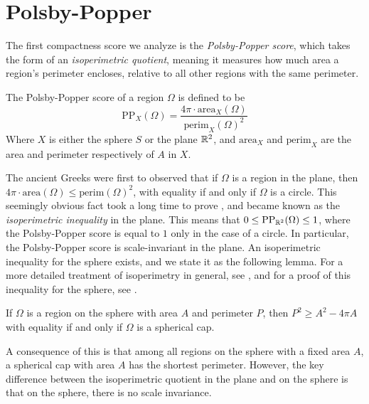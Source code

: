 \section{Polsby-Popper}\label{sec:pp}
The first compactness score we analyze is the \textit{Polsby-Popper
score}, which takes the form of an \textit{isoperimetric quotient},
meaning it measures how much area a region's perimeter encloses,
relative to all other regions with the same perimeter.

\begin{definition}\label{def:pp}
  The Polsby-Popper score of a region $\Omega$ is defined to be
  $$\mathrm{PP}_X(\Omega) = \frac{4\pi
  \cdot\mathrm{area}_X(\Omega)}{\mathrm{perim}_X(\Omega)^2}$$ 
  Where $X$ is either the sphere $S$ or the plane $\mathbb{R}^2$, and
  $\mathrm{area}_X$ and $\mathrm{perim}_X$ are the area and perimeter
  respectively of $A$ in $X$.
\end{definition}

The ancient Greeks were first to observed that if $\Omega$ is a region
in the plane, then $4\pi\cdot\mathrm{area}(\Omega)\leq
\mathrm{perim}(\Omega)^2$, with equality if and only if $\Omega$ is
a circle. This seemingly obvious fact took a long time to prove%
, and became known as the \textit{isoperimetric inequality} in
the plane.  This means that $0\le \mathrm{PP}_{\mathbb{R}^2}(\Omega)\le 1$,
where the Polsby-Popper score is equal to $1$ only in the case of
a circle. In particular, the Polsby-Popper score is scale-invariant in
the plane. An isoperimetric inequality for the sphere exists, and we
state it as the following lemma.  For a more detailed treatment of
isoperimetry in general, see \cite{osserman1979bonnesen}, and for
a proof of this inequality for the sphere, see \cite{rado}.

\begin{lemma}
  If $\Omega$ is a region on the  sphere with area
  $A$ and perimeter $P$, then $P^2\geq A^2-4\pi A$ with equality if
  and only if $\Omega$ is a spherical cap.
\end{lemma}
A consequence of this is that among all regions on the sphere with
a fixed area $A$, a spherical cap with area $A$ has the shortest
perimeter. However, the key difference between the isoperimetric 
quotient in the plane and on the sphere is that on the 
sphere, there is no scale invariance.


